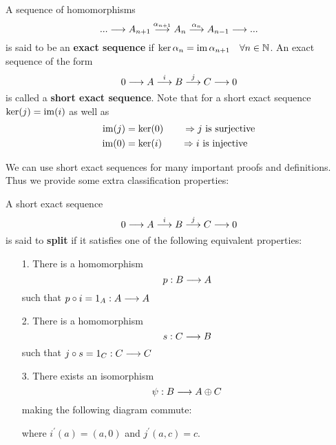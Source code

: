 \begin{definition}
  A sequence of homomorphisms
  $$ ... \longrightarrow A_{n+1} \overset{\alpha_{n+1}}{\longrightarrow} A_{n} \overset{\alpha_{n}}{\longrightarrow} A_{n-1} \longrightarrow ... $$
  is said to be an \textbf{exact sequence} if $ \ker \alpha_n = \operatorname{im} \alpha_{n+1} \quad \forall n \in \mathbb{N} $. An exact sequence of the form
  $$ 0 \longrightarrow A \overset{i}{\longrightarrow} B \overset{j}{\longrightarrow} C \longrightarrow 0 $$
  is called a \textbf{short exact sequence}. Note that for a short exact sequence $\ker(j) = \operatorname{im}(i)$ as well as
  \begin{align*}
    \operatorname{im}(j) &= \ker(0) \quad \quad \Rightarrow j \ \text{is surjective}\\
    \operatorname{im}(0) &= \ker(i) \quad \quad \Rightarrow i \ \text{is injective}\\
  \end{align*}
\end{definition}

We can use short exact sequences for many important proofs and definitions. Thus we provide some extra classification properties:

\begin{definition}
  A short exact sequence
  $$ 0 \longrightarrow A \overset{i}{\longrightarrow} B \overset{j}{\longrightarrow} C \longrightarrow 0 $$
  is said to \textbf{split} if it satisfies one of the following equivalent properties:
  \begin{itemize}
    \item[1.] There is a homomorphism
    $$ p:B \longrightarrow A $$
    such that $p\circ i = 1_A: A\longrightarrow A$
    \item[2.] There is a homomorphism
    $$ s:C \longrightarrow B $$
    such that $j \circ s = 1_C: C\longrightarrow C$
    \item[3.] There exists an isomorphism
    $$ \psi:B \longrightarrow A\oplus C $$
    making the following diagram commute:
    \begin{center}
    \end{center}

    where $i^\prime(a) = (a,0)$ and $j^\prime(a,c) = c$.
  \end{itemize}
\end{definition}

